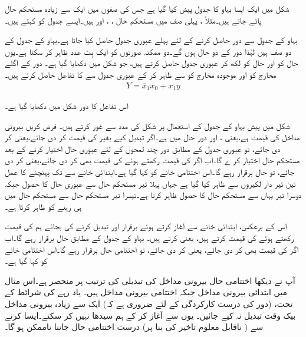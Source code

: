 شکل میں ایک ایسا بہاو کا جدول پیش کیا گیا ہے جس کی صفوں میں ایک سے زیادہ مستحکم حال پائے جاتے ہیں۔مثلاً ، پہلی صف میں مستحکم حال ، ، اور  ہیں۔ایسے جدول کو  کہتے ہیں۔

 بہاو کے جدول سے دور حاصل کرنے کے لئے پہلے عبوری جدول حاصل کیا جاتا ہے۔بہاو کے جدول کے دو صف ہیں لہٰذا دور کے دو حال ہوں گے۔دو ممکنہ صورتوں کو ایک بِٹ عدد ظاہر کر سکتا ہے۔یوں حال  کو  اور حال  کو  لکھ کر عبوری جدول حاصل کرتے ہیں، جو شکل میں دکھایا گیا ہے۔ دور کے اگلے مخارج کو  اور موجودہ مخارج کو  سے ظاہر کر کے عبوری جدول سے  کا تفاعل حاصل کرتے ہیں۔
\begin{align}
Y=\overline{x}_1x_0+x_1y
\end{align}

اس تفاعل کا دور شکل میں دکھایا گیا ہے۔

 شکل میں پیش بہاو کے جدول کے استعمال پر شکل  کی مدد سے غور کرتے ہیں۔ فرض کریں بیرونی مداخل  کی قیمت  ہے،یعنی  ، اور دور حال  میں ہے۔اگر  تبدیل کیے بغیر  کی قیمت  کر دی جائے،یعنی  کر دی جائے، تو عبوری جدول کے مطابق دور چند لمحوں کے لئے عبوری حال  اختیار کرنے کے بعد مستحکم حال  اختیار کر ے گا۔اب اگر  کی قیمت  رکھتے ہوئے  کی قیمت بھی  کر دی جائے،یعنی  کر دی جائے، تو حال  برقرار رہے گا۔اس اختتامی خانے کو کہا گیا ہے۔ابتدائی خانے سے تک پہنچنے کا عمل تین تیر دار لکیروں سے ظاہر کیا گیا ہے جہاں پہلا تیر مستحکم حال  سے عبوری حال  کا حصول جبکہ دوسرا تیر یہاں سے مستحکم حال  کا حصول ظاہر کرتا ہے۔تیسرا تیر مستحکم حال  سے مستحکم حال  میں ہی رہنے کو ظاہر کرتا ہے۔

اس کے برعکس، ابتدائی خانے سے آغاز کرتے ہوئے  برقرار اور  تبدیل کرنے کی بجائے ہم  کی قیمت رکھتے ہوئے  کی قیمت  کرتے ہیں، یعنی  کرتے ہیں۔ بہاو کے جدول کے مطابق حال  برقرار رہے گا۔اب اگر  کی قیمت بھی  کر دی جائے، یعنی  کر دی جائے، تو اختتامی حال برقرار  رہے گا۔اس اختتامی خانے کو  کہا گیا ہے۔

آپ نے دیکھا اختتامی حال بیرونی مداخل کی تبدیلی کی ترتیب پر منحصر ہے۔اس مثال میں ابتدائی بیرونی مداخل  جبکہ اختتامی بیرونی مداخل  ہیں۔ یاد رہے  کی شرائط کے تحت، (دور کی درست کارکردگی کے لئے ضروری ہے کہ) ایک سے زیادہ بیرونی مداخل بیک وقت تبدیل نہ کیے جائیں۔ یوں  سے آغاز کر کے ہم سیدھا  نہیں کر سکتے۔ایسا کرنے سے ( ناقابل معلوم تاخیر کی بنا پر) درست اختتامی حال جاننا ناممکن ہو گا۔


